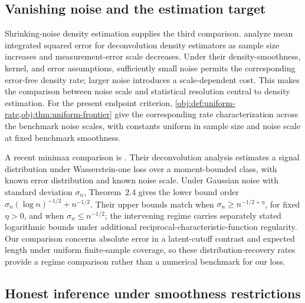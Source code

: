 \documentclass[11pt]{article}
\begin{document}
\subsection{Vanishing noise and the estimation target}

Shrinking-noise density estimation supplies the third comparison. \citet[Theorems~2.1 and 2.2]{Delaigle2008ShrinkingNoise} analyze mean integrated squared error for deconvolution density estimators as sample size increases and measurement-error scale decreases. Under their density-smoothness, kernel, and error assumptions, sufficiently small noise permits the corresponding error-free density rate; larger noise introduces a scale-dependent cost. This makes the comparison between noise scale and statistical resolution central to density estimation. For the present endpoint criterion, \cref{obj:def:uniform-rate,obj:thm:uniform-frontier} give the corresponding rate characterization across the benchmark noise scales, with constants uniform in sample size and noise scale at fixed benchmark smoothness.

A recent minimax comparison is \citet[Section~2, Theorems~2.4--2.6]{DurotMukherjee2026VanishingNoise}. Their deconvolution analysis estimates a signal distribution under Wasserstein-one loss over a moment-bounded class, with known error distribution and known noise scale. Under Gaussian noise with standard deviation \(\sigma_n\), Theorem~2.4 gives the lower bound order \(\sigma_n(\log n)^{-1/2}+n^{-1/2}\). Their upper bounds match when \(\sigma_n\ge n^{-1/2+\eta}\), for fixed \(\eta>0\), and when \(\sigma_n\le n^{-1/2}\); the intervening regime carries separately stated logarithmic bounds under additional reciprocal-characteristic-function regularity. Our comparison concerns absolute error in a latent-cutoff contrast and expected length under uniform finite-sample coverage, so these distribution-recovery rates provide a regime comparison rather than a numerical benchmark for our loss.

\subsection{Honest inference under smoothness restrictions}
\end{document}
